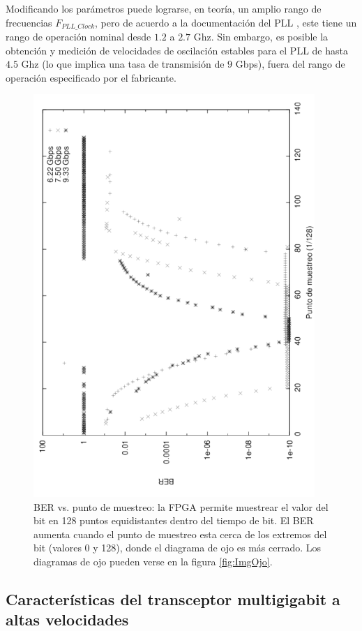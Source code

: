  Modificando los parámetros puede lograrse, en teoría, un amplio rango
de frecuencias $F_{PLL\_Clock}$, pero de acuerdo a la documentación
del PLL \cite[Pág. 71]{ug366}, este tiene un rango de operación nominal desde $1.2$ a
$2.7$ Ghz. Sin embargo, es posible \cite{OBGAH2010} la
obtención y medición de velocidades de oscilación estables para el PLL
de hasta $4.5$ Ghz (lo que implica una tasa de transmisión de $9$ Gbps),
fuera del rango de operación especificado por el fabricante.

\begin{figure}[t]
  \centering
    \includegraphics[width=4.2in,angle=270]{graphs/BER_sp_gray.pdf}
\caption {BER vs. punto de muestreo: la FPGA permite muestrear el valor del bit en 128 puntos equidistantes dentro del tiempo de bit. El BER aumenta cuando el punto de muestreo esta cerca de los extremos del bit (valores 0 y 128), donde el diagrama de ojo es más cerrado. Los diagramas de ojo pueden verse en la figura \ref{fig:ImgOjo}.}
\label{fig:BERvsSamplingPoint}
\end{figure}

\subsection{Características del transceptor multigigabit a altas velocidades}


